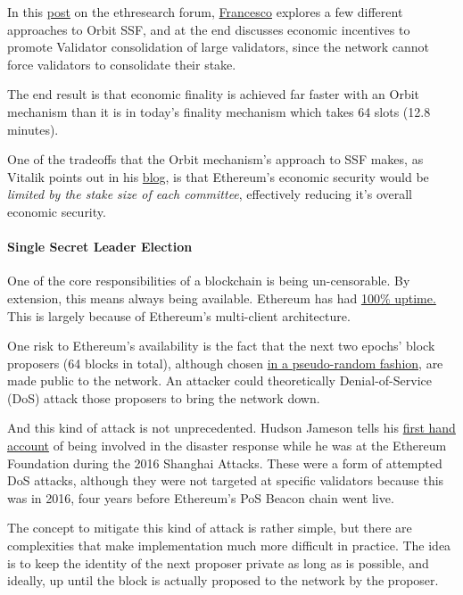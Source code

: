 \documentclass[12pt]{article}
\newcommand{\subsubsubsection}[1]{%
  \paragraph{#1}\mbox{}\par
}
\begin{document}
In this \href{https://ethresear.ch/t/orbit-ssf-solo-staking-friendly-validator-set-management-for-ssf/19928}{post} on the ethresearch forum, \href{https://x.com/fradamt}{Francesco} explores a few different approaches to Orbit SSF, and at the end discusses economic incentives to promote Validator consolidation of large validators, since the network cannot force validators to consolidate their stake. 

The end result is that economic finality is achieved far faster with an Orbit mechanism than it is in today's finality mechanism which takes 64 slots (12.8 minutes). 

One of the tradeoffs that the Orbit mechanism's approach to SSF makes, as Vitalik points out in his \href{https://vitalik.eth.limo/general/2024/10/14/futures1.html#:~:text=but%20are%20okay%20with%20the%20cost%20of%20attack%20being%20perhaps%2010x%20less%20than%20today}{blog}, is that Ethereum's economic security would be \textit{limited by the stake size of each committee}, effectively reducing it's overall economic security. 

\subsubsubsection{Single Secret Leader Election}
\label{Single Secret Leader Election}

One of the core responsibilities of a blockchain is being un-censorable. By extension, this means always being available. Ethereum has had \href{https://ethereumuptime.org/}{100\% uptime.} This is largely because of Ethereum's multi-client architecture. 

One risk to Ethereum's availability is the fact that the next two epochs' block proposers (64 blocks in total), although chosen \href{https://eth2book.info/capella/part2/building_blocks/randomness/}{in a pseudo-random fashion}, are made public to the network. An attacker could theoretically Denial-of-Service (DoS) attack those proposers to bring the network down. 

And this kind of attack is not unprecedented. Hudson Jameson tells his \href{https://www.youtube.com/watch?v=hYPCtij_h4o}{first hand account} of being involved in the disaster response while he was at the Ethereum Foundation during the 2016 Shanghai Attacks. These were a form of attempted DoS attacks, although they were not targeted at specific validators because this was in 2016, four years before Ethereum's PoS Beacon chain went live. 

The concept to mitigate this kind of attack is rather simple, but there are complexities that make implementation much more difficult in practice. The idea is to keep the identity of the next proposer private as long as is possible, and ideally, up until the block is actually proposed to the network by the proposer. 
\end{document}
